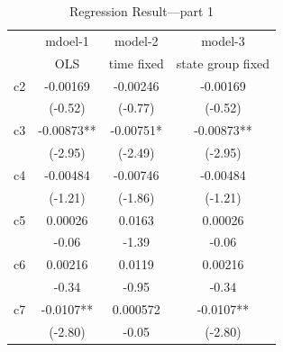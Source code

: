 \documentclass[man]{apa7}
\begin{document}
\begin{table}[htbp]
  \centering
  \caption{Regression Result---part 1}
  \begin{tabular}{cccc}
    \toprule
                                     & mdoel-1                      & model-2                       & model-3                      \\
                                     & OLS                          & time fixed                    & state group fixed            \\
    \midrule
    \multicolumn{1}{p{4.215em}}{c2}  & \multicolumn{1}{c}{-0.00169} & \multicolumn{1}{c}{-0.00246}  & \multicolumn{1}{c}{-0.00169} \\
                                     & (-0.52)                      & (-0.77)                       & (-0.52)                      \\
    \multicolumn{1}{p{4.215em}}{c3}  & -0.00873**                   & -0.00751*                     & -0.00873**                   \\
                                     & (-2.95)                      & (-2.49)                       & (-2.95)                      \\
    \multicolumn{1}{p{4.215em}}{c4}  & \multicolumn{1}{c}{-0.00484} & \multicolumn{1}{c}{-0.00746}  & \multicolumn{1}{c}{-0.00484} \\
                                     & (-1.21)                      & (-1.86)                       & (-1.21)                      \\
    \multicolumn{1}{p{4.215em}}{c5}  & \multicolumn{1}{c}{0.00026}  & \multicolumn{1}{c}{0.0163}    & \multicolumn{1}{c}{0.00026}  \\
                                     & \multicolumn{1}{c}{-0.06}    & \multicolumn{1}{c}{-1.39}     & \multicolumn{1}{c}{-0.06}    \\
    \multicolumn{1}{p{4.215em}}{c6}  & \multicolumn{1}{c}{0.00216}  & \multicolumn{1}{c}{0.0119}    & \multicolumn{1}{c}{0.00216}  \\
                                     & \multicolumn{1}{c}{-0.34}    & \multicolumn{1}{c}{-0.95}     & \multicolumn{1}{c}{-0.34}    \\
    \multicolumn{1}{p{4.215em}}{c7}  & -0.0107**                    & \multicolumn{1}{c}{0.000572}  & -0.0107**                    \\
                                     & (-2.80)                      & \multicolumn{1}{c}{-0.05}     & (-2.80)                      \\

\end{tabular}
\end{table}
\end{document}
